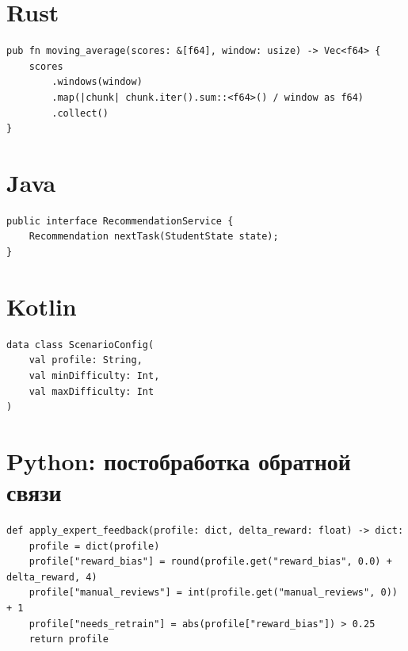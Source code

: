 \section*{Rust}

\begin{lstlisting}[style=sthgcode-rust,caption={Пример расчета скользящего качества}]
pub fn moving_average(scores: &[f64], window: usize) -> Vec<f64> {
    scores
        .windows(window)
        .map(|chunk| chunk.iter().sum::<f64>() / window as f64)
        .collect()
}
\end{lstlisting}

\section*{Java}

\begin{lstlisting}[style=sthgcode-java,caption={Пример интерфейса рекомендательного сервиса}]
public interface RecommendationService {
    Recommendation nextTask(StudentState state);
}
\end{lstlisting}

\section*{Kotlin}

\begin{lstlisting}[style=sthgcode-kotlin,caption={Пример конфигурации адаптивного сценария}]
data class ScenarioConfig(
    val profile: String,
    val minDifficulty: Int,
    val maxDifficulty: Int
)
\end{lstlisting}

\section*{Python: постобработка обратной связи}

\begin{lstlisting}[style=sthgcode-python,caption={Пример обновления профиля после экспертной ревизии}]
def apply_expert_feedback(profile: dict, delta_reward: float) -> dict:
    profile = dict(profile)
    profile["reward_bias"] = round(profile.get("reward_bias", 0.0) + delta_reward, 4)
    profile["manual_reviews"] = int(profile.get("manual_reviews", 0)) + 1
    profile["needs_retrain"] = abs(profile["reward_bias"]) > 0.25
    return profile
\end{lstlisting}
